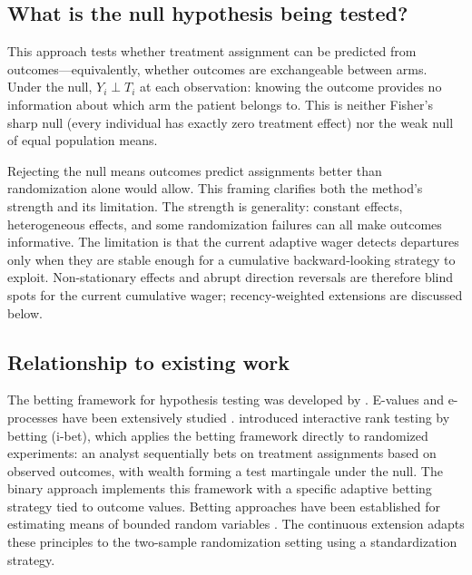 \documentclass[10pt]{article}
\begin{document}
\subsection{What is the null hypothesis being tested?}

This approach tests whether treatment assignment can be predicted from outcomes---equivalently, whether outcomes are exchangeable between arms. Under the null, $Y_i \perp T_i$ at each observation: knowing the outcome provides no information about which arm the patient belongs to. This is neither Fisher's sharp null (every individual has exactly zero treatment effect) nor the weak null of equal population means.

Rejecting the null means outcomes predict assignments better than randomization alone would allow. This framing clarifies both the method's strength and its limitation. The strength is generality: constant effects, heterogeneous effects, and some randomization failures can all make outcomes informative. The limitation is that the current adaptive wager detects departures only when they are stable enough for a cumulative backward-looking strategy to exploit. Non-stationary effects and abrupt direction reversals are therefore blind spots for the current cumulative wager; recency-weighted extensions are discussed below.

\subsection{Relationship to existing work}

The betting framework for hypothesis testing was developed by \citet{shafer2021}. E-values and e-processes have been extensively studied \citep{vovk2021, ramdas2022, ramdas2025}. \citet{pmlr-v177-duan22a} introduced interactive rank testing by betting (i-bet), which applies the betting framework directly to randomized experiments: an analyst sequentially bets on treatment assignments based on observed outcomes, with wealth forming a test martingale under the null. The binary approach implements this framework with a specific adaptive betting strategy tied to outcome values. Betting approaches have been established for estimating means of bounded random variables \citep{waudbysmith2023estimating}. The continuous extension adapts these principles to the two-sample randomization setting using a standardization strategy.
\end{document}
